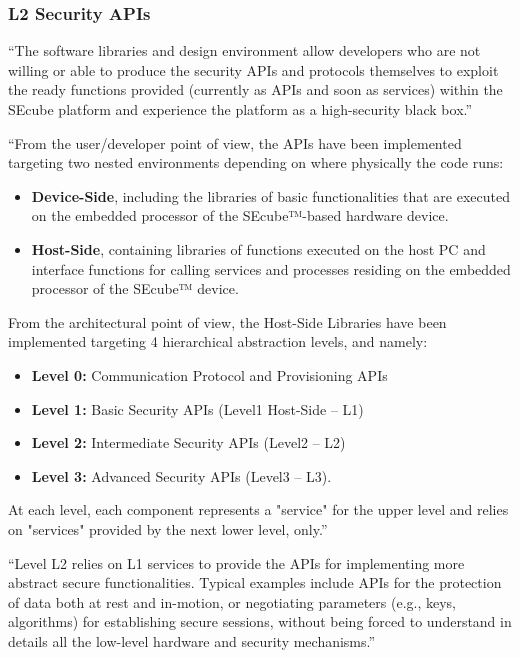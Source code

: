\subsubsection{L2 Security APIs}

``The software libraries and design environment allow developers who are not willing or able to produce the security APIs and protocols themselves to exploit the ready functions provided (currently as APIs and soon as services) within the SEcube platform and experience the platform as a high-security black box.'' \cite{L2UserMan}





``From the user/developer point of view, the APIs have been implemented targeting two
nested environments depending on where physically the code runs:
\begin{itemize}
\item \textbf{Device-Side}, including the libraries of basic functionalities that are executed on the embedded processor of the SEcube™-based hardware device.
\item \textbf{Host-Side}, containing libraries of functions executed on the host PC and interface functions for calling services and processes residing on the embedded processor of the SEcube™ device.
\end{itemize} 

From the architectural point of view, the Host-Side Libraries have been implemented targeting 4 hierarchical abstraction levels, and namely:
\begin{itemize}
\item \textbf{Level 0:} Communication Protocol and Provisioning APIs
\item \textbf{Level 1:} Basic Security APIs (Level1 Host-Side – L1)
\item \textbf{Level 2:} Intermediate Security APIs (Level2 – L2)
\item \textbf{Level 3:} Advanced Security APIs (Level3 – L3).
\end{itemize}

At each level, each component represents a "service" for the upper level and relies on "services" provided by the next lower level, only.'' \cite{L2UserMan}

``Level L2 relies on L1 services to provide the APIs for implementing more abstract secure functionalities. Typical examples include APIs for the protection of data both at rest and in-motion, or negotiating parameters (e.g., keys, algorithms) for establishing secure sessions, without being forced to understand in details all the low-level hardware and security mechanisms.''\cite{L2UserMan}

